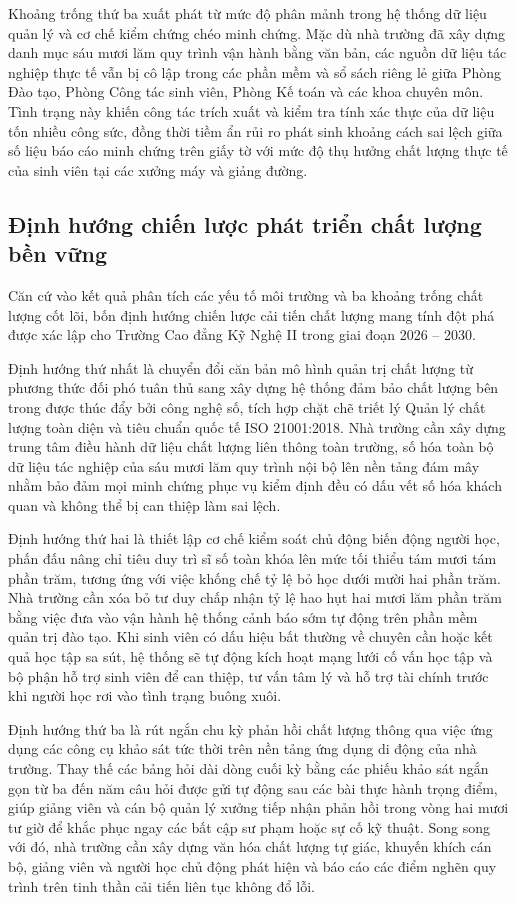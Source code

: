 Khoảng trống thứ ba xuất phát từ mức độ phân mảnh trong hệ thống dữ liệu quản lý và cơ chế kiểm chứng chéo minh chứng. Mặc dù nhà trường đã xây dựng danh mục sáu mươi lăm quy trình vận hành bằng văn bản, các nguồn dữ liệu tác nghiệp thực tế vẫn bị cô lập trong các phần mềm và sổ sách riêng lẻ giữa Phòng Đào tạo, Phòng Công tác sinh viên, Phòng Kế toán và các khoa chuyên môn. Tình trạng này khiến công tác trích xuất và kiểm tra tính xác thực của dữ liệu tốn nhiều công sức, đồng thời tiềm ẩn rủi ro phát sinh khoảng cách sai lệch giữa số liệu báo cáo minh chứng trên giấy tờ với mức độ thụ hưởng chất lượng thực tế của sinh viên tại các xưởng máy và giảng đường.

\subsection{Định hướng chiến lược phát triển chất lượng bền vững}

Căn cứ vào kết quả phân tích các yếu tố môi trường và ba khoảng trống chất lượng cốt lõi, bốn định hướng chiến lược cải tiến chất lượng mang tính đột phá được xác lập cho Trường Cao đẳng Kỹ Nghệ II trong giai đoạn 2026 -- 2030.

Định hướng thứ nhất là chuyển đổi căn bản mô hình quản trị chất lượng từ phương thức đối phó tuân thủ sang xây dựng hệ thống đảm bảo chất lượng bên trong được thúc đẩy bởi công nghệ số, tích hợp chặt chẽ triết lý Quản lý chất lượng toàn diện và tiêu chuẩn quốc tế ISO 21001:2018. Nhà trường cần xây dựng trung tâm điều hành dữ liệu chất lượng liên thông toàn trường, số hóa toàn bộ dữ liệu tác nghiệp của sáu mươi lăm quy trình nội bộ lên nền tảng đám mây nhằm bảo đảm mọi minh chứng phục vụ kiểm định đều có dấu vết số hóa khách quan và không thể bị can thiệp làm sai lệch.

Định hướng thứ hai là thiết lập cơ chế kiểm soát chủ động biến động người học, phấn đấu nâng chỉ tiêu duy trì sĩ số toàn khóa lên mức tối thiểu tám mươi tám phần trăm, tương ứng với việc khống chế tỷ lệ bỏ học dưới mười hai phần trăm. Nhà trường cần xóa bỏ tư duy chấp nhận tỷ lệ hao hụt hai mươi lăm phần trăm bằng việc đưa vào vận hành hệ thống cảnh báo sớm tự động trên phần mềm quản trị đào tạo. Khi sinh viên có dấu hiệu bất thường về chuyên cần hoặc kết quả học tập sa sút, hệ thống sẽ tự động kích hoạt mạng lưới cố vấn học tập và bộ phận hỗ trợ sinh viên để can thiệp, tư vấn tâm lý và hỗ trợ tài chính trước khi người học rơi vào tình trạng buông xuôi.

Định hướng thứ ba là rút ngắn chu kỳ phản hồi chất lượng thông qua việc ứng dụng các công cụ khảo sát tức thời trên nền tảng ứng dụng di động của nhà trường. Thay thế các bảng hỏi dài dòng cuối kỳ bằng các phiếu khảo sát ngắn gọn từ ba đến năm câu hỏi được gửi tự động sau các bài thực hành trọng điểm, giúp giảng viên và cán bộ quản lý xưởng tiếp nhận phản hồi trong vòng hai mươi tư giờ để khắc phục ngay các bất cập sư phạm hoặc sự cố kỹ thuật. Song song với đó, nhà trường cần xây dựng văn hóa chất lượng tự giác, khuyến khích cán bộ, giảng viên và người học chủ động phát hiện và báo cáo các điểm nghẽn quy trình trên tinh thần cải tiến liên tục không đổ lỗi.

